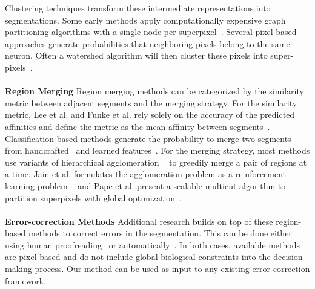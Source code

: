 Clustering techniques transform these intermediate representations into segmentations.
Some early methods apply computationally expensive graph partitioning algorithms with a single node per superpixel~\cite{andres2012globally}.
Several pixel-based approaches generate probabilities that neighboring pixels belong to the same neuron.
Often a watershed algorithm will then cluster these pixels into super-pixels~\cite{zlateski2015image}.
\\~\\
\noindent\textbf{Region Merging}
Region merging methods can be categorized by the similarity metric between adjacent segments and the merging strategy.
For the similarity metric, Lee et al. and Funke et al. rely solely on the accuracy of the predicted affinities and define the metric as the mean affinity between segments~\cite{lee2017superhuman,funke2017deep}.
Classification-based methods generate the probability to merge two segments from handcrafted~\cite{seymour2016rhoananet,nunez2014graph,parag2017anisotropic,zlateski2015image,10.1371/journal.pone.0125825,jain2011learning} and learned features~\cite{bogovic2013learned}. 
For the merging strategy, most methods use variants of hierarchical agglomeration ~\cite{seymour2016rhoananet,nunez2014graph,parag2017anisotropic,zlateski2015image,10.1371/journal.pone.0125825} to greedily merge a pair of regions at a time.
Jain et al. formulates the agglomeration problem as a reinforcement learning problem ~\cite{jain2011learning} and Pape et al. present a scalable multicut algorithm to partition superpixels with global optimization~\cite{beier2017multicut}.
\\~\\
\noindent\textbf{Error-correction Methods}
 Additional research builds on top of these region-based methods to correct errors in the segmentation. This can be done either using human proofreading~\cite{haehn2014design,haehn2017guided,mojo2} or automatically~\cite{rolnick2017morphological,error_correction_using_CNN}. In both cases, available methods are pixel-based and do not include global biological constraints into the decision making process. Our method can be used as input to any existing error correction framework.




